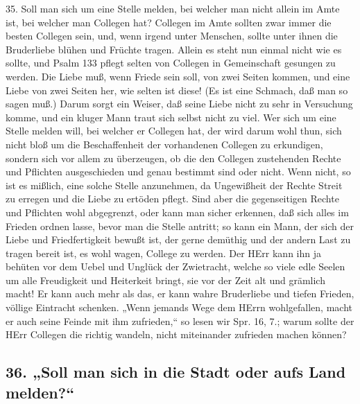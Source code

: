 35. Soll man sich um eine Stelle melden, bei welcher man nicht allein im Amte ist, bei welcher man Collegen hat? Collegen im Amte sollten zwar immer die besten Collegen sein, und, wenn irgend unter Menschen, sollte unter ihnen die Bruderliebe blühen und Früchte tragen. Allein es steht nun einmal nicht wie es sollte, und Psalm 133 pflegt selten von Collegen in Gemeinschaft gesungen zu werden. Die Liebe muß, wenn Friede sein soll, von zwei Seiten kommen, und eine Liebe von zwei Seiten her, wie selten ist diese! (Es ist eine Schmach, daß man so sagen muß.) Darum sorgt ein Weiser, daß seine Liebe nicht zu sehr in Versuchung komme, und ein kluger Mann traut sich selbst nicht zu viel. Wer sich um eine Stelle melden will, bei welcher er Collegen hat, der wird darum wohl thun, sich nicht bloß um die Beschaffenheit der vorhandenen Collegen zu erkundigen, sondern sich vor allem zu überzeugen, ob die den Collegen zustehenden Rechte und Pflichten ausgeschieden und genau bestimmt sind oder nicht. Wenn nicht, so ist es mißlich, eine solche Stelle anzunehmen, da Ungewißheit der Rechte Streit zu erregen und die Liebe zu ertöden pflegt. Sind aber die gegenseitigen Rechte und Pflichten wohl abgegrenzt, oder kann man sicher erkennen, daß sich alles im Frieden ordnen lasse, bevor man die Stelle antritt; so kann ein Mann, der sich der Liebe und Friedfertigkeit bewußt ist, der gerne
demüthig und der andern Last zu tragen bereit ist, es wohl wagen, College zu werden. Der HErr kann ihn ja behüten vor dem Uebel und Unglück der Zwietracht, welche so viele edle Seelen um alle Freudigkeit und Heiterkeit bringt, sie vor der Zeit alt und grämlich macht! Er kann auch mehr als das, er kann wahre Bruderliebe und tiefen Frieden, völlige Eintracht schenken. „Wenn jemands Wege dem HErrn wohlgefallen, macht er auch seine Feinde mit ihm zufrieden,“ so lesen wir Spr. 16, 7.; warum sollte der HErr Collegen die richtig wandeln, nicht miteinander zufrieden machen können?

\subsection[36. Stadt oder Land]{36. „Soll man sich in die Stadt oder aufs Land melden?“}

